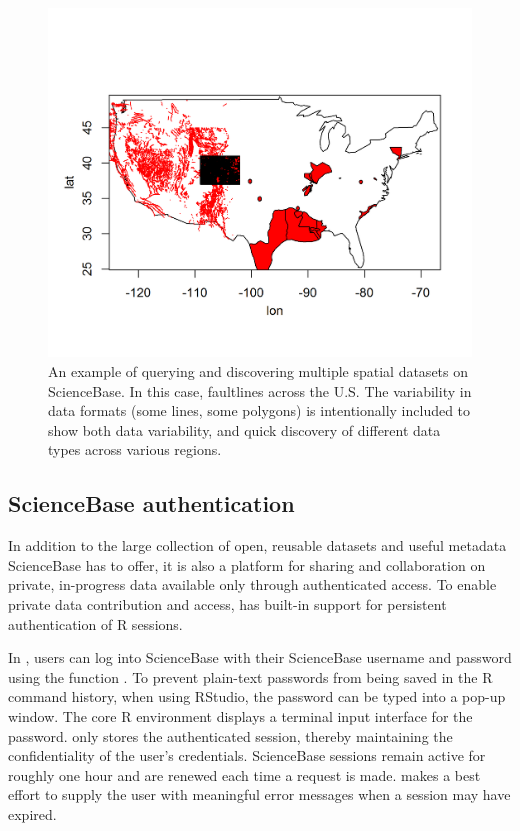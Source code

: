  \begin{figure}[htbp]
   \centering
   \includegraphics{faultlinefig}
   \caption{An example of querying and discovering multiple
   spatial datasets on ScienceBase. In this case, faultlines 
   across the U.S. The variability in data formats (some lines, some polygons)
   is intentionally included to show both data variability, and quick discovery 
   of different data types across various regions.}
   \label{figure:faultlinefig}
 \end{figure}

\subsection{ScienceBase authentication}

In addition to the large collection of open, reusable datasets and
useful metadata ScienceBase has to offer, it is
also a platform for sharing and collaboration on private, in-progress
data available only through authenticated access. To enable
private data contribution and access,
 has built-in support for persistent
authentication of R sessions.

In , users can log into ScienceBase with their ScienceBase username
and password using the function . To prevent plain-text
passwords from being saved in the R command history, when using RStudio, 
the password can be typed into a pop-up window. The core R environment displays a 
terminal input interface for the password.  only stores the authenticated session,
thereby maintaining the confidentiality of the user's credentials. ScienceBase
sessions remain active for roughly one hour and are renewed each time a request
is made.  makes a best effort to supply the user with meaningful
error messages when a session may have expired.

